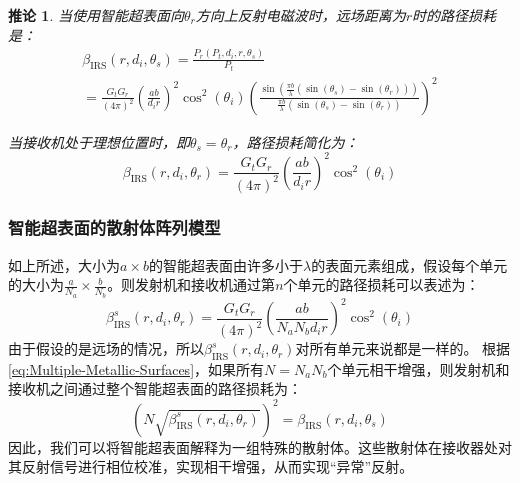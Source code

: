 \documentclass[supercite]{HustGraduPaper}
\newtheorem{corollary}{\indent 推论}[section]
\begin{document}
\begin{corollary}
	当使用智能超表面向$\theta_r$方向上反射电磁波时，远场距离为$r$时的路径损耗是：
	\begin{equation}
		\begin{array}{l}
			\beta_{\mathrm{IRS}}\left(r, d_{i}, \theta_{s}\right)=\frac{P_{r}\left(P_{t}, d_{i}, r, \theta_{s}\right)}{P_{t}} \\
			=\frac{G_{t} G_{r}}{(4 \pi)^{2}}\left(\frac{a b}{d_{i} r}\right)^{2} \cos ^{2}\left(\theta_{i}\right)\left(\frac{\sin \left(\frac{\pi b}{\lambda}\left(\sin \left(\theta_{s}\right)-\sin \left(\theta_{r}\right)\right)\right)}{\frac{\pi b}{\lambda}\left(\sin \left(\theta_{s}\right)-\sin \left(\theta_{r}\right)\right)}\right)^{2}
		\end{array}
	\end{equation}

	当接收机处于理想位置时，即$\theta_s=\theta_r$，路径损耗简化为：
	\begin{equation}
		\beta_{\mathrm{IRS}}\left(r, d_{i}, \theta_{r}\right)=\frac{G_{t} G_{r}}{(4 \pi)^{2}}\left(\frac{a b}{d_{i} r}\right)^{2} \cos ^{2}\left(\theta_{i}\right)
	\end{equation}
\end{corollary}

\subsubsection{智能超表面的散射体阵列模型}

如上所述，大小为$a \times b$的智能超表面由许多小于$\lambda$的表面元素组成，假设每个单元的大小为$\frac{a}{N_a} \times \frac{b}{N_b}$。则发射机和接收机通过第$n$个单元的路径损耗可以表述为：
\begin{equation}
	\beta_{\mathrm{IRS}}^{s}\left(r, d_{i}, \theta_{r}\right)=\frac{G_{t} G_{r}}{(4 \pi)^{2}}\left(\frac{a b}{N_{a} N_{b} d_{i} r}\right)^{2} \cos ^{2}\left(\theta_{i}\right)
\end{equation}
由于假设的是远场的情况，所以$\beta_{\mathrm{IRS}}^{s}\left(r, d_{i}, \theta_{r}\right)$对所有单元来说都是一样的。
根据\autoref{eq:Multiple-Metallic-Surfaces}，如果所有$N=N_a N_b$个单元相干增强，则发射机和接收机之间通过整个智能超表面的路径损耗为：
\begin{equation}
	\left(N \sqrt{\beta_{\mathrm{IRS}}^{s}\left(r, d_{i}, \theta_{r}\right)}\right)^{2}=\beta_{\mathrm{IRS}}\left(r, d_{i}, \theta_{s}\right)
\end{equation}
因此，我们可以将智能超表面解释为一组特殊的散射体。这些散射体在接收器处对其反射信号进行相位校准，实现相干增强，从而实现“异常”反射。
\end{document}
